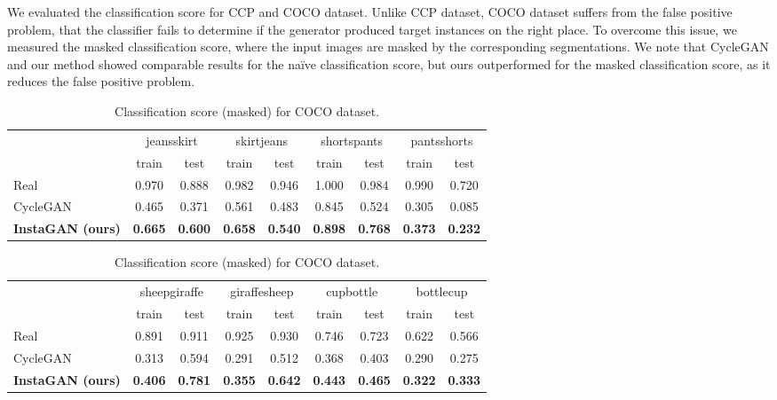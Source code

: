 \documentclass{article} \usepackage{iclr2019_conference,times}
\begin{document}
We evaluated the classification score for CCP and COCO dataset.
Unlike CCP dataset, COCO dataset suffers from the false positive problem,
that the classifier fails to determine if the generator produced target instances on the right place. To overcome this issue, we measured the masked classification score,
where the input images are masked by the corresponding segmentations.
We note that CycleGAN and our method showed comparable results for the na\"ive classification score,
but ours outperformed for the masked classification score, as it reduces the false positive problem.

\begin{table}[H]
\caption{
Classification score for CCP dataset.
} \label{tab:cls-ccp}
\centering
\begin{tabular}{lcccc|cccc}
	\toprule
	& \multicolumn{2}{c}{jeansskirt} & \multicolumn{2}{c}{skirtjeans} & \multicolumn{2}{|c}{shortspants} & \multicolumn{2}{c}{pantsshorts} \\
	\cmidrule{2-5} \cmidrule{6-9}
	& train & test & train & test & train & test & train & test \\
	\midrule
	Real & 0.970 & 0.888 & 0.982 & 0.946 & 1.000 & 0.984 & 0.990 & 0.720 \\
	\midrule
	CycleGAN & 0.465 & 0.371 & 0.561 & 0.483 & 0.845 & 0.524 & 0.305 & 0.085 \\
	\textbf{InstaGAN (ours)} & \textbf{0.665} & \textbf{0.600} & \textbf{0.658} & \textbf{0.540} & \textbf{0.898} & \textbf{0.768} & \textbf{0.373} & \textbf{0.232} \\
	\bottomrule
\end{tabular}
\vspace{0.1in}
\caption{
Classification score (masked) for COCO dataset.
} \label{tab:cls-coco}
\begin{tabular}{lcccc|cccc}
	\toprule
    & \multicolumn{2}{c}{sheepgiraffe} & \multicolumn{2}{c}{giraffesheep} & \multicolumn{2}{|c}{cupbottle} & \multicolumn{2}{c}{bottlecup} \\
	\cmidrule{2-5} \cmidrule{6-9}
	& train & test & train & test & train & test & train & test \\
	\midrule
	Real & 0.891 & 0.911 & 0.925 & 0.930 & 0.746 & 0.723 & 0.622 & 0.566 \\
	\midrule
	CycleGAN & 0.313 & 0.594 & 0.291 & 0.512 & 0.368 & 0.403 & 0.290 & 0.275 \\
	\textbf{InstaGAN (ours)} & \textbf{0.406} & \textbf{0.781} & \textbf{0.355} & \textbf{0.642} & \textbf{0.443} & \textbf{0.465} & \textbf{0.322} & \textbf{0.333} \\
	\bottomrule
\end{tabular}
\end{table}
\end{document}
